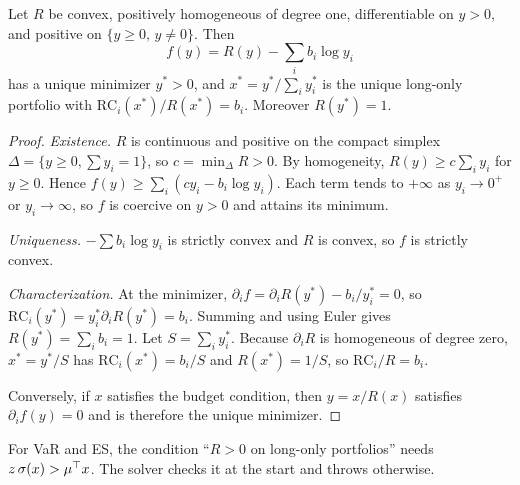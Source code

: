 \documentclass[11pt,a4paper]{article}
\begin{document}
\begin{theorem}\label{thm:rb}
Let $R$ be convex, positively homogeneous of degree one, differentiable on $y>0$, and
positive on $\{y\ge0,\,y\ne0\}$. Then
\[
  f(y)=R(y)-\sum_ib_i\log y_i
\]
has a unique minimizer $y^\ast>0$, and $x^\ast=y^\ast/\sum_iy^\ast_i$ is the unique long-only
portfolio with $\mathrm{RC}_i(x^\ast)/R(x^\ast)=b_i$. Moreover $R(y^\ast)=1$.
\end{theorem}
\begin{proof}
\emph{Existence.} $R$ is continuous and positive on the compact simplex
$\Delta=\{y\ge0,\sum y_i=1\}$, so $c=\min_\Delta R>0$. By homogeneity,
$R(y)\ge c\sum_iy_i$ for $y\ge0$. Hence $f(y)\ge\sum_i(cy_i-b_i\log y_i)$. Each term tends
to $+\infty$ as $y_i\to0^+$ or $y_i\to\infty$, so $f$ is coercive on $y>0$ and attains
its minimum.

\emph{Uniqueness.} $-\sum b_i\log y_i$ is strictly convex and $R$ is convex, so $f$ is
strictly convex.

\emph{Characterization.} At the minimizer, $\partial_if=\partial_iR(y^\ast)-b_i/y^\ast_i=0$,
so $\mathrm{RC}_i(y^\ast)=y^\ast_i\partial_iR(y^\ast)=b_i$. Summing and using Euler gives
$R(y^\ast)=\sum_ib_i=1$. Let $S=\sum_iy^\ast_i$. Because $\partial_iR$ is homogeneous of
degree zero, $x^\ast=y^\ast/S$ has $\mathrm{RC}_i(x^\ast)=b_i/S$ and $R(x^\ast)=1/S$, so
$\mathrm{RC}_i/R=b_i$.

Conversely, if $x$ satisfies the budget condition, then $y=x/R(x)$ satisfies
$\partial_if(y)=0$ and is therefore the unique minimizer.
\end{proof}

For VaR and ES, the condition ``$R>0$ on long-only portfolios'' needs
$z\,\sigma(x)>\mu^\top x$. The solver checks it at the start and throws otherwise.
\end{document}
